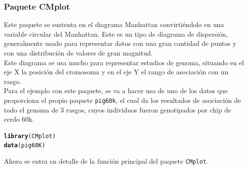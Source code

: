 \documentclass{article}\usepackage[]{graphicx}\usepackage[]{color}
\makeatletter
\newcommand{\hlstd}[1]{\textcolor[rgb]{0.345,0.345,0.345}{#1}}%
\newcommand{\hlkwd}[1]{\textcolor[rgb]{0.737,0.353,0.396}{\textbf{#1}}}%
\newenvironment{kframe}{%
 \def\at@end@of@kframe{}%
 \ifinner\ifhmode%
  \def\at@end@of@kframe{\end{minipage}}%
  \begin{minipage}{\columnwidth}%
 \fi\fi%
 \def\FrameCommand##1{\hskip\@totalleftmargin \hskip-\fboxsep
 \colorbox{shadecolor}{##1}\hskip-\fboxsep
     \hskip-\linewidth \hskip-\@totalleftmargin \hskip\columnwidth}%
 \MakeFramed {\advance\hsize-\width
   \@totalleftmargin\z@ \linewidth\hsize
   \@setminipage}}%
 {\par\unskip\endMakeFramed%
 \at@end@of@kframe}
\newenvironment{knitrout}{}{} %
\makeatother
\begin{document}
\subsubsection{Paquete CMplot}
Este paquete se sustenta en el diagrama Manhattan convirti\'endolo en una variable circular del Manhattan\cite{docu_CMplot}. Este es un tipo de diagrama de dispersi\'on, generalmente usado para representar datos con una gran cantidad de puntos y con una distribuci\'on de valores de gran magnitud.~\\
Este diagrama se usa mucho para representar estudios de genoma, situando en el eje X la posici\'on del cromosoma y en el eje Y el rango de asociaci\'on con un rasgo.~\\
Para el ejemplo con este paquete, se va a hacer uso de uno de los datos que proporciona el propio paquete \texttt{pig60k}, el cual da los resultados de asociaci\'on de todo el genoma de 3 rasgos, cuyos individuos fueron genotipados por chip de cerdo 60k.
\begin{knitrout}
\color{fgcolor}\begin{kframe}
\begin{alltt}
\hlkwd{library}\hlstd{(CMplot)}
\hlkwd{data}\hlstd{(pig60K)}
\end{alltt}
\end{kframe}
\end{knitrout}
Ahora se entra en detalle de la funci\'on principal del paquete \texttt{CMplot}.
\end{document}
